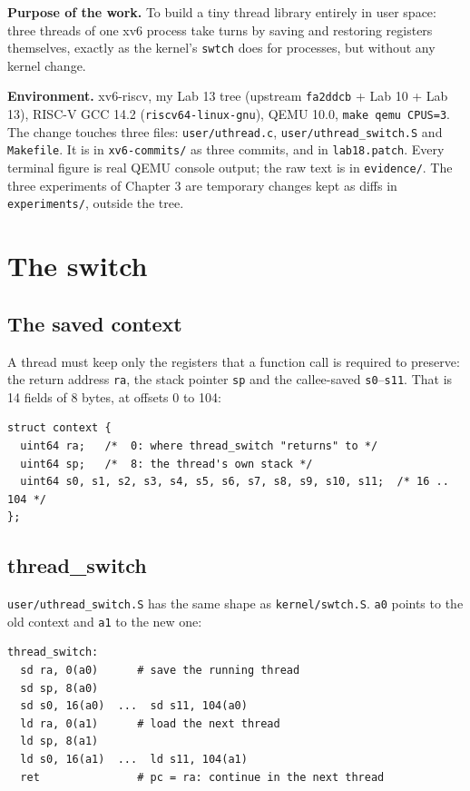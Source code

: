 \documentclass{assets/utmreport}
\begin{document}
\sloppy
\makeutmreporttitlepage
{\small\tableofcontents}

\utmintroduction
\textbf{Purpose of the work.} To build a tiny thread library entirely in user space: three threads of one xv6 process take turns by saving and restoring registers themselves, exactly as the kernel's \texttt{swtch} does for processes, but without any kernel change.

\textbf{Environment.} xv6-riscv, my Lab 13 tree (upstream \texttt{fa2ddcb} + Lab 10 + Lab 13), RISC-V GCC 14.2 (\texttt{riscv64-linux-gnu}), QEMU 10.0, \texttt{make qemu CPUS=3}. The change touches three files: \texttt{user/uthread.c}, \texttt{user/uthread\_switch.S} and \texttt{Makefile}. It is in \texttt{xv6-commits/} as three commits, and in \texttt{lab18.patch}. Every terminal figure is real QEMU console output; the raw text is in \texttt{evidence/}. The three experiments of Chapter 3 are temporary changes kept as diffs in \texttt{experiments/}, outside the tree.

\chapter{The switch}

\section{The saved context}
A thread must keep only the registers that a function call is required to preserve: the return address \texttt{ra}, the stack pointer \texttt{sp} and the callee-saved \texttt{s0}--\texttt{s11}. That is 14 fields of 8 bytes, at offsets 0 to 104:
\begin{lstlisting}
struct context {
  uint64 ra;   /*  0: where thread_switch "returns" to */
  uint64 sp;   /*  8: the thread's own stack */
  uint64 s0, s1, s2, s3, s4, s5, s6, s7, s8, s9, s10, s11;  /* 16 .. 104 */
};
\end{lstlisting}

\section{thread\_switch}
\texttt{user/uthread\_switch.S} has the same shape as \texttt{kernel/swtch.S}. \texttt{a0} points to the old context and \texttt{a1} to the new one:
\begin{lstlisting}
thread_switch:
  sd ra, 0(a0)      # save the running thread
  sd sp, 8(a0)
  sd s0, 16(a0)  ...  sd s11, 104(a0)
  ld ra, 0(a1)      # load the next thread
  ld sp, 8(a1)
  ld s0, 16(a1)  ...  ld s11, 104(a1)
  ret               # pc = ra: continue in the next thread
\end{lstlisting}
\end{document}
